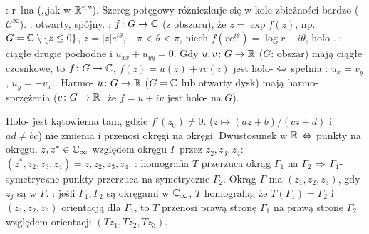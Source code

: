 : {r--lna}  (,,jak w $\mathbb{R}^n$'').
Szereg potęgowy różniczkuje się w kole zbieżności bardzo ($\mathscr C^\infty$).
: otwarty, spójny.
: $f \colon G \to \mathbb{C}$ (z obszaru), że $z = \exp f(z)$, np. $G = \mathbb{C} \setminus \{z \le 0\}$, $z = |z| e^{i \theta}$, $-\pi <\theta < \pi$, niech $f(re^{i \theta}) = \log r + i\theta$, holo-.
: ciągłe drugie pochodne i $u_{xx} + u_{yy} = 0$.
Gdy $u, v \colon G \to \mathbb{R}$ ($G$: obszar) mają ciągłe czosnkowe, to $f \colon G \to \mathbb{C}$, $f(z) = u(z) + iv(z)$ jest holo- $\Leftrightarrow$ spełnia : $u_x = v_y$, $u_y = -v_x$..
Harmo- $u \colon G \to \mathbb{R}$ ($G = \mathbb{C}$ lub otwarty dysk) mają harmo- sprzężenia ($v \colon G \to \mathbb{R}$, że $f=u+iv$ jest holo- na $G$).

Holo-  jest kątowierna tam, gdzie $f'(z_0)\neq 0$.
 ($z \mapsto (az+b)/(cz+d)$ i $ad\neq bc$) nie zmienia  i przenosi okręgi na okręgi.
Dwustosunek w $\mathbb{R}$ $\Leftrightarrow$ punkty na okręgu.
 $z, z^* \in \mathbb{C}_\infty$ względem okręgu $\Gamma$ przez $z_2, z_3, z_4$: $(z^*, z_2, z_3, z_4) = \overline{z, z_2,z_3,z_4}$.
: homografia $T$ przerzuca okrąg $\Gamma_1$ na $\Gamma_2$ $\Rightarrow$ $\Gamma_1$-symetryczne punkty przerzuca na symetryczne-$\Gamma_2$.
Okrąg $\Gamma$ ma  $(z_1, z_2, z_3)$, gdy $z_j$ są w $\Gamma$.
: jeśli $\Gamma_1, \Gamma_2$ są okręgami w $\mathbb{C}_\infty$, $T$ homografią, że $T(\Gamma_1) = \Gamma_2$ i $(z_1, z_2, z_3)$ orientacją dla $\Gamma_1$, to $T$ przenosi prawą stronę $\Gamma_1$ na prawą stronę $\Gamma_2$ względem orientacji $(T z_1, Tz_2, Tz_3)$.

